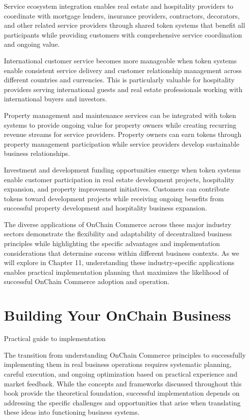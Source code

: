 \documentclass[
  Letterpaper,
]{scrbook}
\begin{document}
Service ecosystem integration enables real estate and hospitality
providers to coordinate with mortgage lenders, insurance providers,
contractors, decorators, and other related service providers through
shared token systems that benefit all participants while providing
customers with comprehensive service coordination and ongoing value.

International customer service becomes more manageable when token
systems enable consistent service delivery and customer relationship
management across different countries and currencies. This is
particularly valuable for hospitality providers serving international
guests and real estate professionals working with international buyers
and investors.

Property management and maintenance services can be integrated with
token systems to provide ongoing value for property owners while
creating recurring revenue streams for service providers. Property
owners can earn tokens through property management participation while
service providers develop sustainable business relationships.

Investment and development funding opportunities emerge when token
systems enable customer participation in real estate development
projects, hospitality expansion, and property improvement initiatives.
Customers can contribute tokens toward development projects while
receiving ongoing benefits from successful property development and
hospitality business expansion.

The diverse applications of OnChain Commerce across these major industry
sectors demonstrate the flexibility and adaptability of decentralized
business principles while highlighting the specific advantages and
implementation considerations that determine success within different
business contexts. As we will explore in Chapter 11, understanding these
industry-specific applications enables practical implementation planning
that maximizes the likelihood of successful OnChain Commerce adoption
and operation.

\chapter{Building Your OnChain Business}\label{sec-building-business}

Practical guide to implementation

The transition from understanding OnChain Commerce principles to
successfully implementing them in real business operations requires
systematic planning, careful execution, and ongoing optimization based
on practical experience and market feedback. While the concepts and
frameworks discussed throughout this book provide the theoretical
foundation, successful implementation depends on addressing the specific
challenges and opportunities that arise when translating these ideas
into functioning business systems.
\end{document}
